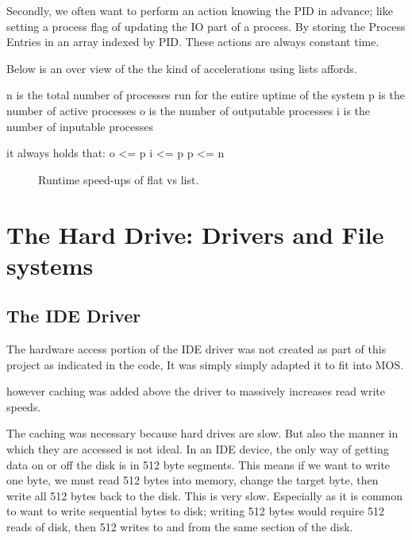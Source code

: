 \documentclass[a4paper]{report}
\begin{document}
Secondly, we often want to perform an action knowing the PID in advance; like setting a process flag of updating the IO part of a process. By storing the Process Entries in an array indexed by PID. These actions are always constant time.

Below is an over view of the the kind of accelerations using lists affords.

n is the total number of processes run for the entire uptime of the system
p is the number of active processes
o is the number of outputable processes
i is the number of inputable processes

it always holds that:
o <= p
i <= p
p <= n

\begin{figure}[ht]
  \centering

  \def\svgwidth{\columnwidth}
  \caption{Runtime speed-ups of flat vs list.}
  \label{fig:schedulerscreen}
\end{figure}


















\section{The Hard Drive: Drivers and File systems}

\subsection{The IDE Driver}

The hardware access portion of the IDE driver was not created as part of this project as indicated in the code, It was simply simply adapted it to fit into MOS.

however caching was added above the driver to massively increases read write speeds.

The caching was necessary because hard drives are slow. But also the manner in which they are accessed is not ideal. In an IDE device, the only way of getting data on or off the disk is in 512 byte segments. This means if we want to write one byte, we must read 512 bytes into memory, change the target byte, then write all 512 bytes back to the disk. This is very slow. Especially as it is common to want to write sequential bytes to disk; writing 512 bytes would require 512 reads of disk, then 512 writes to and from the same section of the disk.
\end{document}
